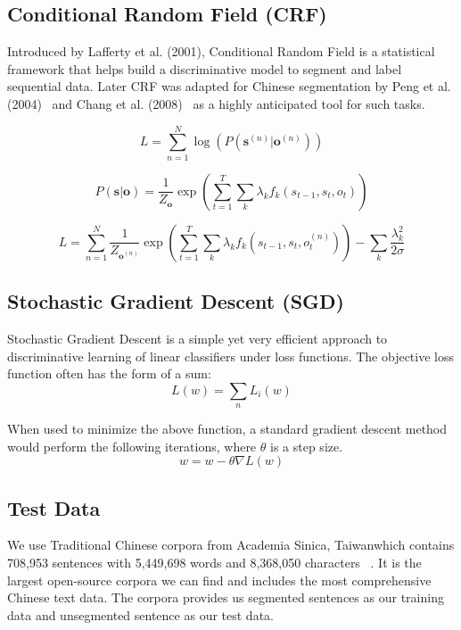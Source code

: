 \documentclass[UTF8,11pt]{article}
\begin{document}
\subsection{Conditional Random Field (CRF)}
\noindent Introduced by Lafferty et al. (2001), Conditional Random Field is a statistical framework that helps build a discriminative model to segment and label sequential data. Later CRF was adapted for Chinese segmentation by Peng et al. (2004)~\cite{biblo0} and Chang et al. (2008)~\cite{biblo2} as a highly anticipated tool for such tasks. 

\begin{equation} \label{eq:log_likelihood}
    L = \sum_{n=1}^N \log(P( \mathbf{s}^{(n)} | \mathbf{o}^{(n)} ))
\end{equation}

\begin{equation} \label{eq:crf_likelihood}
    P(\mathbf{s}|\mathbf{o}) = \frac{1}{Z_{\mathbf{o}}} \exp \left( \sum_{t=1}^{T} \sum_{k} \lambda_k f_k(s_{t-1}, s_t, o_t) \right)
\end{equation}

\begin{equation} \label{eq:crf_log}
    L = \sum_{n=1}^{N} \frac{1}{Z_{\mathbf{o}^{(n)}}} \exp \left( \sum_{t=1}^{T} \sum_{k} \lambda_k f_k (s_{t-1}, s_t, o^{(n)}_t)\right) - \sum_{k} \frac{\lambda_k^2}{2\sigma}
\end{equation}
\subsection{Stochastic Gradient Descent (SGD)}
\noindent Stochastic Gradient Descent is a simple yet very efficient approach to discriminative learning of linear classifiers under loss functions. The objective loss function often has the form of a sum:
\begin{equation}
    L(w) = \sum_{n} L_i (w)
\end{equation} 

When used to minimize the above function, a standard gradient descent method would perform the following iterations, where $\theta$ is a step size.
\begin{equation}
    w = w - \theta \nabla L (w)
\end{equation}

\subsection{Test Data}
\noindent We use Traditional Chinese corpora from Academia Sinica, Taiwanwhich contains 708,953 sentences with 5,449,698 words and 8,368,050 characters~\cite{bakeoff_data} . It is the largest open-source corpora we can find and includes the most comprehensive Chinese text data. The corpora provides us segmented sentences as our training data and unsegmented sentence as our test data.
\end{document}
